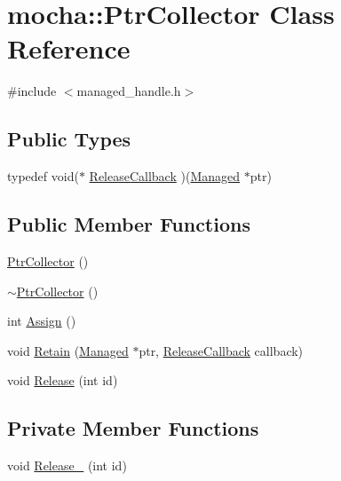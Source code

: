 \hypertarget{classmocha_1_1_ptr_collector}{
\section{mocha::PtrCollector Class Reference}
\label{classmocha_1_1_ptr_collector}
}


{\ttfamily \#include $<$managed\_\-handle.h$>$}

\subsection*{Public Types}
\begin{DoxyCompactItemize}
\item 
typedef void($\ast$ \hyperlink{classmocha_1_1_ptr_collector_a5ec1946ab80fe57d29680f29ef30abb1}{ReleaseCallback} )(\hyperlink{classmocha_1_1_managed}{Managed} $\ast$ptr)
\end{DoxyCompactItemize}
\subsection*{Public Member Functions}
\begin{DoxyCompactItemize}
\item 
\hyperlink{classmocha_1_1_ptr_collector_a985abed94b4308146869e8e34df66f7b}{PtrCollector} ()
\begin{DoxyCompactList}\small\item\em \end{DoxyCompactList}\item 
\hyperlink{classmocha_1_1_ptr_collector_a39389d92abc44e038ff0e57026e3c58e}{$\sim$PtrCollector} ()
\item 
int \hyperlink{classmocha_1_1_ptr_collector_af4d665b5e2e680ae044ac33c7586171f}{Assign} ()
\item 
void \hyperlink{classmocha_1_1_ptr_collector_a42b67ee26445d6d3e53d09ba4f556c2a}{Retain} (\hyperlink{classmocha_1_1_managed}{Managed} $\ast$ptr, \hyperlink{classmocha_1_1_ptr_collector_a5ec1946ab80fe57d29680f29ef30abb1}{ReleaseCallback} callback)
\item 
void \hyperlink{classmocha_1_1_ptr_collector_a4570c542b2e2e283144c565a0b2a0c30}{Release} (int id)
\end{DoxyCompactItemize}
\subsection*{Private Member Functions}
\begin{DoxyCompactItemize}
\item 
void \hyperlink{classmocha_1_1_ptr_collector_a1dcf02ec601b0daf5a3559b857a5f032}{Release\_\-} (int id)
\end{DoxyCompactItemize}
